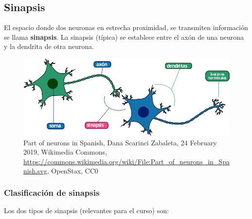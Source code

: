 \subsection{Sinapsis}

 El espacio donde dos neuronas en estrecha proximidad, se transmiten información se llama \textbf{sinapsis}. La sinapsis (típica) se establece entre el axón de una neurona y la dendrita de otra neurona. \parencite{sistemaNervioso}%



\begin{figure}[h]
 \centering
 \includegraphics[scale=0.5]{../Figuras/Part_of_neurons_in_Spanish.png}
 \caption{Part of neurons in Spanish, Dana Scarinci Zabaleta, 24 February 2019, Wikimedia Commons, \url{https://commons.wikimedia.org/wiki/File:Part_of_neurons_in_Spanish.svg}, OpenStax, CC0}
 \label{fig:sinapsisN}
\end{figure}


\subsubsection{Clasificación de sinapsis}

Los dos tipos de sinapsis (relevantes para el curso) son:

